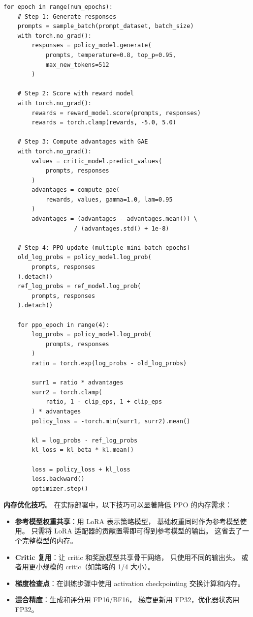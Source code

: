 \begin{lstlisting}[caption={RLHF PPO training loop (high-level)}]
for epoch in range(num_epochs):
    # Step 1: Generate responses
    prompts = sample_batch(prompt_dataset, batch_size)
    with torch.no_grad():
        responses = policy_model.generate(
            prompts, temperature=0.8, top_p=0.95,
            max_new_tokens=512
        )

    # Step 2: Score with reward model
    with torch.no_grad():
        rewards = reward_model.score(prompts, responses)
        rewards = torch.clamp(rewards, -5.0, 5.0)

    # Step 3: Compute advantages with GAE
    with torch.no_grad():
        values = critic_model.predict_values(
            prompts, responses
        )
        advantages = compute_gae(
            rewards, values, gamma=1.0, lam=0.95
        )
        advantages = (advantages - advantages.mean()) \
                    / (advantages.std() + 1e-8)

    # Step 4: PPO update (multiple mini-batch epochs)
    old_log_probs = policy_model.log_prob(
        prompts, responses
    ).detach()
    ref_log_probs = ref_model.log_prob(
        prompts, responses
    ).detach()

    for ppo_epoch in range(4):
        log_probs = policy_model.log_prob(
            prompts, responses
        )
        ratio = torch.exp(log_probs - old_log_probs)

        surr1 = ratio * advantages
        surr2 = torch.clamp(
            ratio, 1 - clip_eps, 1 + clip_eps
        ) * advantages
        policy_loss = -torch.min(surr1, surr2).mean()

        kl = log_probs - ref_log_probs
        kl_loss = kl_beta * kl.mean()

        loss = policy_loss + kl_loss
        loss.backward()
        optimizer.step()
\end{lstlisting}

\textbf{内存优化技巧}。
在实际部署中，以下技巧可以显著降低 PPO 的内存需求：
\begin{itemize}[noitemsep]
  \item \textbf{参考模型权重共享}：用 LoRA 表示策略模型，
        基础权重同时作为参考模型使用。
        只需将 LoRA 适配器的贡献置零即可得到参考模型的输出。
        这省去了一个完整模型的内存。
  \item \textbf{Critic 复用}：让 critic 和奖励模型共享骨干网络，
        只使用不同的输出头。
        或者用更小规模的 critic（如策略的 1/4 大小）。
  \item \textbf{梯度检查点}：在训练步骤中使用
        activation checkpointing 交换计算和内存。
  \item \textbf{混合精度}：生成和评分用 FP16/BF16，
        梯度更新用 FP32，优化器状态用 FP32。
\end{itemize}

